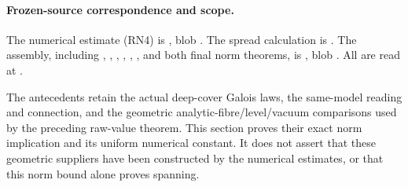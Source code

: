 \paragraph{Frozen-source correspondence and scope.}
The numerical estimate (RN4) is
,
blob .
The spread calculation is
.
The assembly, including , ,
, ,
, , and both final
norm theorems, is
,
blob .
All are read at .

The antecedents retain the actual deep-cover Galois laws,
the same-model reading and connection, and the geometric
analytic-fibre/level/vacuum comparisons used by the preceding
raw-value theorem.  This section proves their exact norm
implication and its uniform numerical constant.
It does not assert that these geometric suppliers have been
constructed by the numerical estimates, or that this norm
bound alone proves spanning.
